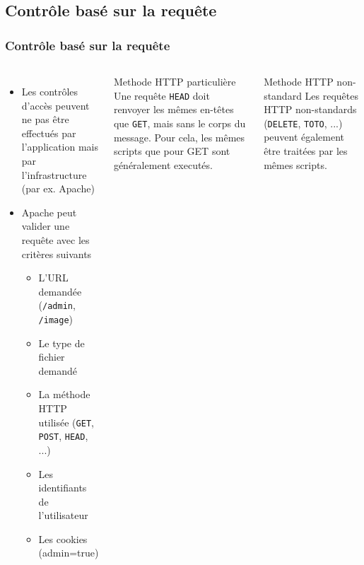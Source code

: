 \documentclass[aspectratio=169]{beamer}  %
\begin{document}
\subsection{Contrôle basé sur la requête}
\begin{frame}
  \frametitle{Contrôle basé sur la requête}
  \begin{columns}[c]
      \begin{itemize}
        \item Les contrôles d'accès peuvent ne pas être effectués par l'application mais par l'infrastructure (par ex. Apache)
        \item Apache peut valider une requête avec les critères suivants
        \begin{itemize}
          \item L'URL demandée (\texttt{/admin}, \texttt{/image})
          \item Le type de fichier demandé
          \item La méthode HTTP utilisée (\texttt{GET}, \texttt{POST}, \texttt{HEAD}, ...)
          \item Les identifiants de l'utilisateur
          \item Les cookies (admin=true)
        \end{itemize}
      \end{itemize}
      \begin{block}{Methode HTTP particulière}
        Une requête \texttt{HEAD} doit renvoyer les mêmes en-têtes que \texttt{GET}, mais sans le corps du message. Pour cela, les mêmes scripts que pour GET sont généralement executés.
      \end{block}
      \begin{block}{Methode HTTP non-standard}
        Les requêtes HTTP non-standards (\texttt{DELETE}, \texttt{TOTO}, ...) peuvent également être traitées par les mêmes scripts.
      \end{block}
  \end{columns}
\end{frame}
\end{document}
